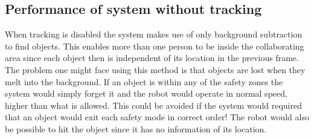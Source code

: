 \subsection{Performance of system without tracking}
When tracking is disabled the system makes use of only background subtraction to find objects.
This enables more than one person to be inside the collaborating area since each object then is independent of its location in the previous frame.\\

The problem one might face using this method is that objects are lost when they melt into the background.
If an object is within any of the safety zones the system would simply forget it and the robot would operate in normal speed, higher than what is allowed.
This could be avoided if the system would required that an object would exit each safety mode in correct order!
The robot would also be possible to hit the object since it has no information of its location.
